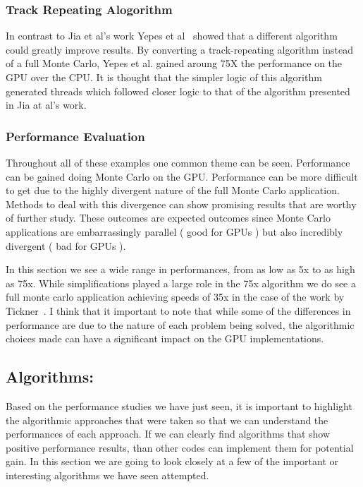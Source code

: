 \subsubsection*{\textbf{Track Repeating Alogorithm}}
In contrast to Jia et al's work Yepes et al~\cite{yepes2010gpu} showed that a different algorithm could greatly improve results.
%
By converting a track-repeating algorithm instead of a full Monte Carlo, Yepes et al. gained aroung 75X the performance on the GPU over the CPU.
%
It is thought that the simpler logic of this algorithm generated threads which followed closer logic to that of the algorithm presented in Jia at al's work.

\subsubsection*{\textbf{Performance Evaluation}}
Throughout all of these examples one common theme can be seen.
%
Performance can be gained doing Monte Carlo on the GPU.
%
Performance can be more difficult to get due to the highly divergent nature of the full Monte Carlo application.
%
Methods to deal with this divergence can show promising results that are worthy of further study.
%
These outcomes are expected outcomes since Monte Carlo applications are embarrassingly parallel ( good for GPUs ) but also incredibly divergent ( bad for GPUs ).
%

In this section we see a wide range in performances, from as low as 5x to as high as 75x.
%
While simplifications played a large role in the 75x algorithm we do see a full monte carlo application achieving speeds of 35x in the case of the work by Tickner~\cite{tickner2010monte}.
%
I think that it important to note that while some of the differences in performance are due to the nature of each problem being solved, the algorithmic choices made can have a significant impact on the GPU implementations.
%

\subsection*{Algorithms:}

Based on the performance studies we have just seen, it is important to highlight the algorithmic approaches that were taken so that we can understand the performances of each approach.
%
If we can clearly find algorithms that show positive performance results, than other codes can implement them for potential gain.
%
In this section we are going to look closely at a few of the important or interesting algorithms we have seen attempted.
%

